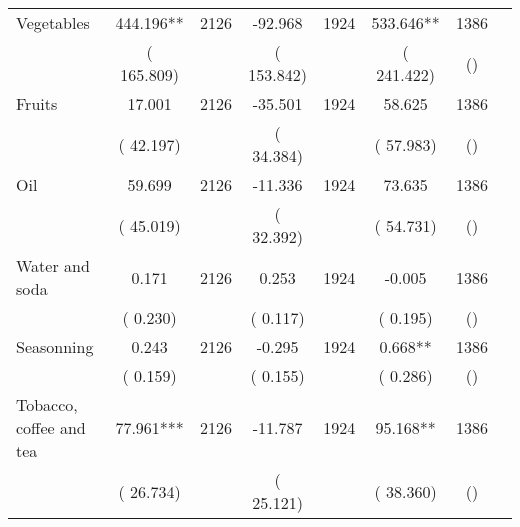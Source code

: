 \begin{tabular}{l*{6}{c}}
Vegetables        &            444.196**      &       2126       &            -92.968      &       1924       &            533.646**      &       1386  &  &              \\
                       &       (     165.809)            &                               &       (     153.842)            &                               &       (     241.422)            &       () &                  \\
Fruits        &             17.001      &       2126       &            -35.501      &       1924       &             58.625      &       1386  &  &              \\
                       &       (      42.197)            &                               &       (      34.384)            &                               &       (      57.983)            &       () &                  \\
Oil        &             59.699      &       2126       &            -11.336      &       1924       &             73.635      &       1386  &  &              \\
                       &       (      45.019)            &                               &       (      32.392)            &                               &       (      54.731)            &       () &                  \\
Water and soda        &              0.171      &       2126       &              0.253      &       1924       &             -0.005      &       1386  &  &              \\
                       &       (       0.230)            &                               &       (       0.117)            &                               &       (       0.195)            &       () &                  \\
Seasonning        &              0.243      &       2126       &             -0.295      &       1924       &              0.668**      &       1386  &  &              \\
                       &       (       0.159)            &                               &       (       0.155)            &                               &       (       0.286)            &       () &                  \\
Tobacco, coffee and tea        &             77.961***      &       2126       &            -11.787      &       1924       &             95.168**      &       1386  &  &              \\
                       &       (      26.734)            &                               &       (      25.121)            &                               &       (      38.360)            &       () &                  \\
\hline \end{tabular}
